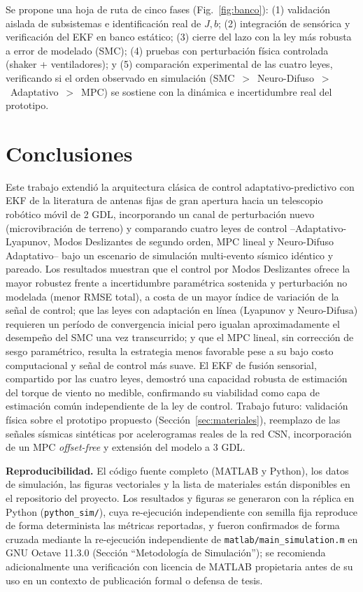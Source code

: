 \documentclass[journal]{IEEEtran}
\begin{document}
Se propone una hoja de ruta de cinco fases (Fig.~\ref{fig:banco}):
(1) validación aislada de subsistemas e identificación real de $J,b$;
(2) integración de sensórica y verificación del EKF en banco estático;
(3) cierre del lazo con la ley más robusta a error de modelado (SMC);
(4) pruebas con perturbación física controlada (shaker + ventiladores); y
(5) comparación experimental de las cuatro leyes, verificando si el orden
observado en simulación (SMC~$>$~Neuro-Difuso~$>$~Adaptativo~$>$~MPC) se
sostiene con la dinámica e incertidumbre real del prototipo.

\section{Conclusiones}

Este trabajo extendió la arquitectura clásica de control adaptativo-predictivo
con EKF de la literatura de antenas fijas de gran apertura hacia un
telescopio robótico móvil de 2 GDL, incorporando un canal de perturbación
nuevo (microvibración de terreno) y comparando cuatro leyes de control
--Adaptativo-Lyapunov, Modos Deslizantes de segundo orden, MPC lineal y
Neuro-Difuso Adaptativo-- bajo un escenario de simulación multi-evento
sísmico idéntico y pareado. Los
resultados muestran que el control por Modos Deslizantes ofrece la mayor
robustez frente a incertidumbre paramétrica sostenida y perturbación no
modelada (menor RMSE total), a costa de un mayor índice de variación de la
señal de control; que las leyes con adaptación en línea (Lyapunov y
Neuro-Difusa) requieren un período de convergencia inicial pero igualan
aproximadamente el desempeño del SMC una vez transcurrido; y que el MPC
lineal, sin corrección de sesgo paramétrico, resulta la estrategia menos
favorable pese a su bajo costo computacional y señal de control más suave.
El EKF de fusión sensorial, compartido por las cuatro leyes, demostró una
capacidad robusta de estimación del torque de viento no medible,
confirmando su viabilidad como capa de estimación común independiente de
la ley de control. Trabajo futuro: validación física sobre el prototipo
propuesto (Sección~\ref{sec:materiales}), reemplazo de las señales
sísmicas sintéticas por acelerogramas reales de la red CSN, incorporación
de un MPC \emph{offset-free} y extensión del modelo a 3 GDL.

\textbf{Reproducibilidad.} El código fuente completo (MATLAB y Python),
los datos de simulación, las figuras vectoriales y la lista de materiales
están disponibles en el repositorio del proyecto. Los resultados y
figuras se generaron con la réplica en Python (\texttt{python\_sim/}),
cuya re-ejecución independiente con semilla fija reproduce de forma
determinista las métricas reportadas, y fueron confirmados de forma
cruzada mediante la re-ejecución independiente de
\texttt{matlab/main\_simulation.m} en GNU Octave 11.3.0 (Sección
``Metodología de Simulación''); se recomienda adicionalmente una
verificación con licencia de MATLAB propietaria antes de su uso en un
contexto de publicación formal o defensa de tesis.

\begingroup
\let\footnotesize\scriptsize


\endgroup
\end{document}
